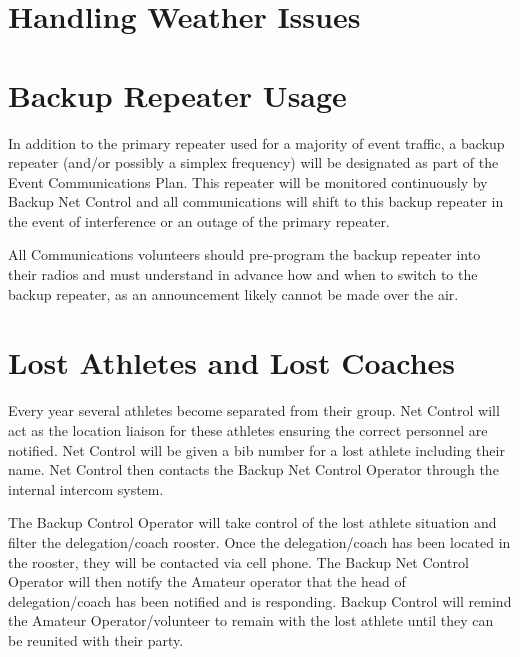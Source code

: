 \documentclass[pdflatex,letterpaper,twoside,12pt]{book}
\begin{document}

\section{Handling Weather Issues}

\iffalse %
 * Clearly define process or criteria in which we begin collecting or
   disseminating weather data?
\fi %


\section{Backup Repeater Usage}

In addition to the primary repeater used for a majority of event traffic, a backup repeater (and/or possibly a simplex frequency) will be designated as part of the Event Communications Plan.  This repeater will be monitored continuously by Backup Net Control and all communications will shift to this backup repeater in the event of interference or an outage of the primary repeater.

All Communications volunteers should pre-program the backup repeater into their radios and must understand in advance how and when to switch to the backup repeater, as an announcement likely cannot be made over the air.


\section{Lost Athletes and Lost Coaches}

Every year several athletes become separated from their group. Net Control will act as the location liaison for these athletes ensuring the correct personnel are notified.  Net Control will be given a bib number for a lost athlete including their name. Net Control then contacts the Backup Net Control Operator through the internal intercom system.

The Backup Control Operator will take control of the lost athlete situation and filter the delegation/coach rooster.  Once the delegation/coach has been located in the rooster, they will be contacted via cell phone.  The Backup Net Control Operator will then notify the Amateur operator that the head of delegation/coach has been notified and is responding.  Backup Control will remind the Amateur Operator/volunteer to remain with the lost athlete until they can be reunited with their party.
\end{document}
